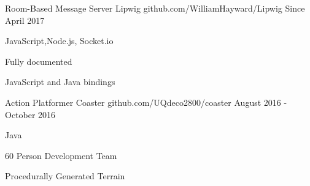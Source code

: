 


\begin{cventries}


\cventry
{Room-Based Message Server} %
{Lipwig} %
{github.com/WilliamHayward/Lipwig} %
{Since April 2017} %
{ %
\begin{cvitems}
\item JavaScript,Node.js, Socket.io
\item Fully documented
\item JavaScript and Java bindings
\end{cvitems}
}


\cventry
{Action Platformer} %
{Coaster} %
{github.com/UQdeco2800/coaster} %
{August 2016 - October 2016} %
{ %
\begin{cvitems}
\item Java
\item 60 Person Development Team
\item Procedurally Generated Terrain
\end{cvitems}
}


\end{cventries}